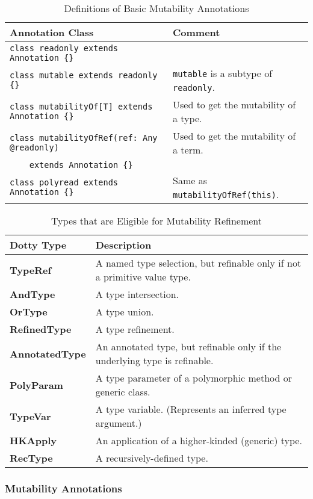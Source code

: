 \documentclass[11pt]{report}
\begin{document}
\begin{table}[p]
\center
\begin{tabular}{ll}
Annotation Class & Comment \\
\hline
\lstinline!class readonly extends Annotation {}! & \\
\lstinline!class mutable extends readonly {}! & \lstinline!mutable! is a subtype of \lstinline!readonly!. \\
\lstinline!class mutabilityOf[T] extends Annotation {}! & Used to get the mutability of a type. \\
\lstinline!class mutabilityOfRef(ref: Any @readonly)! & Used to get the mutability of a term. \\
\lstinline!    extends Annotation {}! & \\
\lstinline!class polyread extends Annotation {}! & Same as \lstinline!mutabilityOfRef(this)!. \\
\end{tabular}
\caption{Definitions of Basic Mutability Annotations}
\label{table:basic-mutability-annotations}
\end{table}

\begin{table}[p]
\center
\begin{tabular}{ll}
Dotty Type & Description \\
\hline
{\bf TypeRef} & A named type selection, but refinable only if not a primitive value type. \\
{\bf AndType} & A type intersection. \\
{\bf OrType} & A type union. \\
{\bf RefinedType} & A type refinement. \\
{\bf AnnotatedType} & An annotated type, but refinable only if the underlying type is refinable. \\
{\bf PolyParam} & A type parameter of a polymorphic method or generic class. \\
{\bf TypeVar} & A type variable. (Represents an inferred type argument.) \\
{\bf HKApply} & An application of a higher-kinded (generic) type. \\
{\bf RecType} & A recursively-defined type. \\
\end{tabular}
\caption{Types that are Eligible for Mutability Refinement}
\label{table:can-have-annotations}
\end{table}

\subsubsection{Mutability Annotations}
\end{document}
